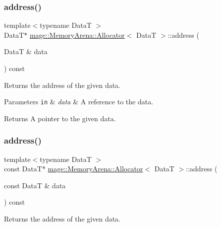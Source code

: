 \subsubsection{\texorpdfstring{address()}{address()}\hspace{0.1cm}{\footnotesize\ttfamily [1/2]}}
{\footnotesize\ttfamily template$<$typename DataT $>$ \\
DataT$\ast$ \hyperlink{structmage_1_1_memory_arena_1_1_allocator}{mage\+::\+Memory\+Arena\+::\+Allocator}$<$ DataT $>$\+::address (\begin{DoxyParamCaption}\item[{DataT \&}]{data }\end{DoxyParamCaption}) const\hspace{0.3cm}{\ttfamily [noexcept]}}

Returns the address of the given data.


\begin{DoxyParams}[1]{Parameters}
\mbox{\tt in}  & {\em data} & A reference to the data. \\
\hline
\end{DoxyParams}
\begin{DoxyReturn}{Returns}
A pointer to the given data. 
\end{DoxyReturn}
\hypertarget{structmage_1_1_memory_arena_1_1_allocator_a823bf66f6693fc85b2ccb146e1c0ba58}{}\label{structmage_1_1_memory_arena_1_1_allocator_a823bf66f6693fc85b2ccb146e1c0ba58} 
\subsubsection{\texorpdfstring{address()}{address()}\hspace{0.1cm}{\footnotesize\ttfamily [2/2]}}
{\footnotesize\ttfamily template$<$typename DataT $>$ \\
const DataT$\ast$ \hyperlink{structmage_1_1_memory_arena_1_1_allocator}{mage\+::\+Memory\+Arena\+::\+Allocator}$<$ DataT $>$\+::address (\begin{DoxyParamCaption}\item[{const DataT \&}]{data }\end{DoxyParamCaption}) const\hspace{0.3cm}{\ttfamily [noexcept]}}

Returns the address of the given data.



